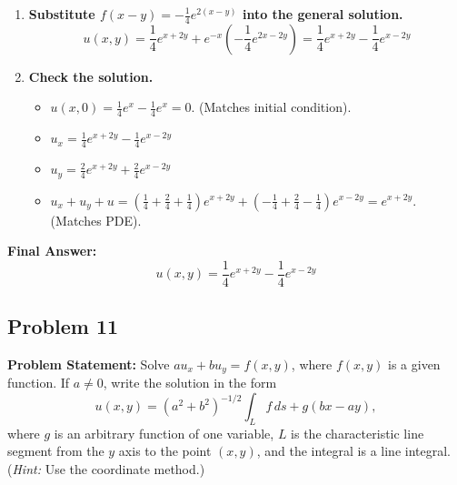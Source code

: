 \documentclass[11pt]{article}
\begin{document}
\begin{enumerate}[label=\textbf{Step \arabic*:}]
    \item \textbf{Substitute $f(x - y) = -\frac{1}{4}e^{2(x - y)}$ into the general solution.} \\
    \[
    u(x, y) = \frac{1}{4}e^{x+2y} + e^{-x}\left(-\frac{1}{4}e^{2x - 2y}\right) = \frac{1}{4}e^{x+2y} - \frac{1}{4}e^{x-2y}
    \]

    \item \textbf{Check the solution.} \\
    \begin{itemize}
        \item $u(x, 0) = \frac{1}{4}e^x - \frac{1}{4}e^x = 0$. (Matches initial condition).
        \item $u_x = \frac{1}{4}e^{x+2y} - \frac{1}{4}e^{x-2y}$
        \item $u_y = \frac{2}{4}e^{x+2y} + \frac{2}{4}e^{x-2y}$
        \item $u_x + u_y + u = \left(\frac{1}{4} + \frac{2}{4} + \frac{1}{4}\right)e^{x+2y} + \left(-\frac{1}{4} + \frac{2}{4} - \frac{1}{4}\right)e^{x-2y} = e^{x+2y}$. (Matches PDE).
    \end{itemize}
\end{enumerate}

\noindent\textbf{Final Answer:}
\[
\boxed{u(x, y) = \frac{1}{4}e^{x+2y} - \frac{1}{4}e^{x-2y}}
\]

\hrulefill

\subsection*{Problem 11}
\textbf{Problem Statement:} Solve $au_x + bu_y = f(x, y)$, where $f(x, y)$ is a given function. If $a \neq 0$, write the solution in the form
\[
u(x, y) = (a^2 + b^2)^{-1/2} \int_L f\,ds + g(bx - ay),
\]
where $g$ is an arbitrary function of one variable, $L$ is the characteristic line segment from the $y$ axis to the point $(x, y)$, and the integral is a line integral. (\emph{Hint:} Use the coordinate method.)
\end{document}
